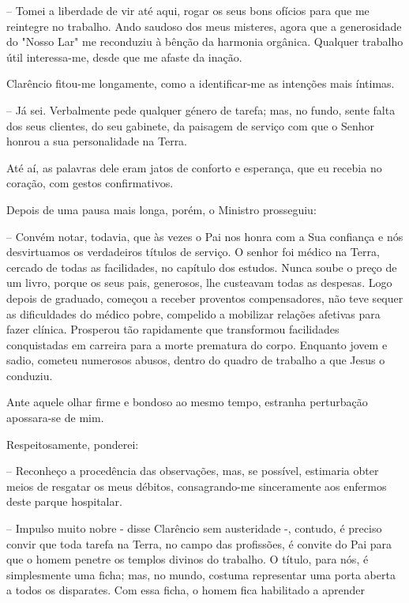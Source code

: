 \documentclass[portuguese,12pt,a4paper]{scrbook}
\begin{document}
	– Tomei a liberdade de vir até aqui, rogar os seus bons ofícios para que me reintegre no trabalho. Ando saudoso dos meus misteres, agora que a generosidade do "Nosso Lar" me reconduziu à bênção da harmonia orgânica. Qualquer trabalho útil interessa-me, desde que me afaste da inação.
	
	Clarêncio fitou-me longamente, como a identificar-me as intenções mais íntimas.
	
	
	– Já sei. Verbalmente pede qualquer género de tarefa; mas, no fundo, sente falta dos seus clientes, do seu gabinete, da paisagem de serviço com que o Senhor honrou a sua personalidade na Terra.
	
	Até aí, as palavras dele eram jatos de conforto e esperança, que eu recebia no coração, com gestos confirmativos.
	
	Depois de uma pausa mais longa, porém, o Ministro prosseguiu:
	
	– Convém notar, todavia, que às vezes o Pai nos honra com a Sua confiança e nós desvirtuamos os verdadeiros títulos de serviço. O senhor foi médico na Terra, cercado de todas as facilidades, no capítulo dos estudos. Nunca soube o preço de um livro, porque os seus pais, generosos, lhe custeavam todas as despesas. Logo depois de graduado, começou a receber proventos compensadores, não teve sequer as dificuldades do médico pobre, compelido a mobilizar relações afetivas para fazer clínica. Prosperou tão rapidamente que transformou facilidades conquistadas em carreira para a morte prematura do corpo. Enquanto jovem e sadio, cometeu numerosos abusos, dentro do quadro de trabalho a que Jesus o conduziu.
	
	Ante aquele olhar firme e bondoso ao mesmo tempo, estranha perturbação apossara-se de mim.
	
	Respeitosamente, ponderei:
	
	– Reconheço a procedência das observações, mas, se possível, estimaria obter meios de resgatar os meus débitos, consagrando-me sinceramente aos enfermos deste parque hospitalar.
	
	– Impulso muito nobre - disse Clarêncio sem austeridade -, contudo, é preciso convir que toda tarefa na Terra, no campo das profissões, é convite do Pai para que o homem penetre os templos divinos do trabalho. O título, para nós, é simplesmente uma ficha; mas, no mundo, costuma representar uma porta aberta a todos os disparates. Com essa ficha, o homem fica habilitado a aprender
	
\end{document}
